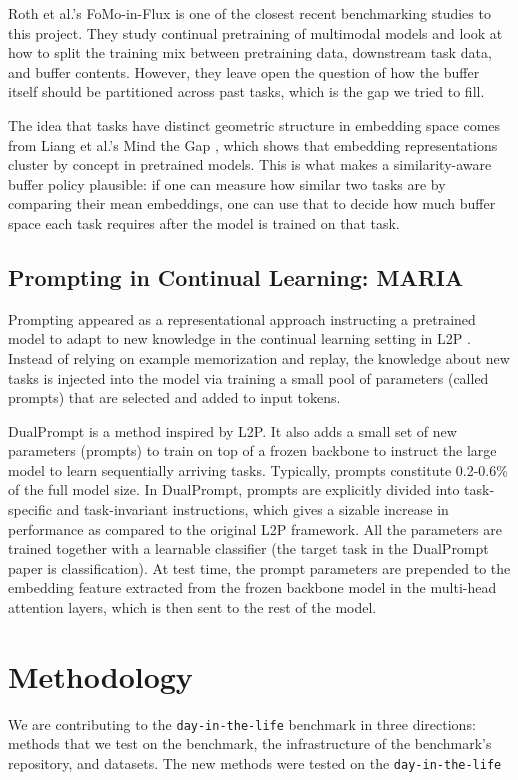 \documentclass{article}
\begin{document}
Roth et al.'s FoMo-in-Flux \cite{fomo-in-flux} is one of the closest recent
benchmarking studies to this project. They study continual pretraining of
multimodal models and look at how to split the training mix between
pretraining data, downstream task data, and buffer contents. However, they
leave open the question of how the buffer itself should be partitioned across
past tasks, which is the gap we tried to fill.

The idea that tasks have distinct geometric structure in embedding space comes
from Liang et al.'s Mind the Gap \cite{mind-the-gap}, which shows that
embedding representations cluster by concept in pretrained models. This is
what makes a similarity-aware buffer policy plausible: if one can measure how
similar two tasks are by comparing their mean embeddings, one can use that to
decide how much buffer space each task requires after the model is trained on
that task.

\subsection{Prompting in Continual Learning: MARIA}
Prompting appeared as a representational approach instructing a pretrained model to adapt to new knowledge in
the continual learning setting in L2P \cite{l2p}. Instead of relying on example memorization and replay, the
knowledge about new tasks is injected into the model via training a small pool of parameters (called prompts)
that are selected and added to input tokens.

DualPrompt \cite{dualprompt} is a method inspired by L2P. It also adds a small set of new parameters
(prompts) to train on top of a frozen backbone to instruct the large model to learn sequentially arriving
tasks. Typically, prompts constitute 0.2-0.6\% of the full model size. In DualPrompt, prompts are explicitly
divided into task-specific and task-invariant instructions, which gives a sizable increase in performance as
compared to the original L2P framework. All the parameters are trained together with a learnable classifier
(the target task in the DualPrompt paper is classification). At test time, the prompt parameters are
prepended to the embedding feature extracted from the frozen backbone model in the multi-head attention
layers, which is then sent to the rest of the model.

\section{Methodology}
We are contributing to the \texttt{day-in-the-life} benchmark in three directions: methods that we test on
the benchmark, the infrastructure of the benchmark’s repository, and datasets. The new methods were tested on
the \texttt{day-in-the-life}
\end{document}

